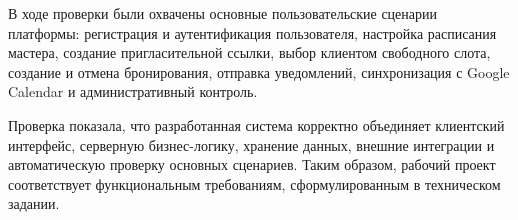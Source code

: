 В ходе проверки были охвачены основные пользовательские сценарии платформы: регистрация и аутентификация пользователя, настройка расписания мастера, создание пригласительной ссылки, выбор клиентом свободного слота, создание и отмена бронирования, отправка уведомлений, синхронизация с Google Calendar и административный контроль.

Проверка показала, что разработанная система корректно объединяет клиентский интерфейс, серверную бизнес-логику, хранение данных, внешние интеграции и автоматическую проверку основных сценариев. Таким образом, рабочий проект соответствует функциональным требованиям, сформулированным в техническом задании.
